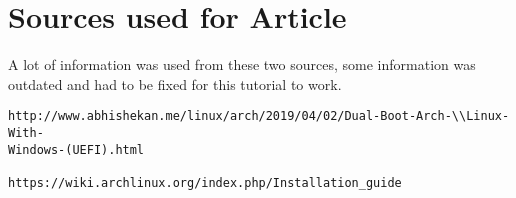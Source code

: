 \documentclass[12pt]{article}
\begin{document}
\color{pink}
\section*{Sources used for Article} \color{white}

\begin{adjustwidth}{0.5cm}{}

A lot of information was used from these two sources, some information was outdated and had to be fixed for this tutorial to work.

\begin{verbatim}
http://www.abhishekan.me/linux/arch/2019/04/02/Dual-Boot-Arch-\\Linux-With-
Windows-(UEFI).html

https://wiki.archlinux.org/index.php/Installation_guide
\end{verbatim}
\end{adjustwidth}
\end{document}
